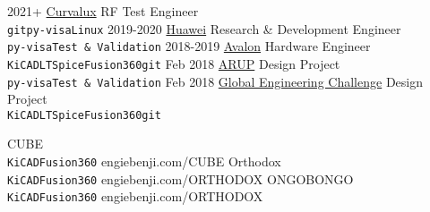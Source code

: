 \documentclass[9pt]{developercv} %
\begin{document}
\begin{entrylist}
	\entry
		{2021+}
		{\href{https://Curvalux.com}{Curvalux}}
		{RF Test Engineer}
		{\lorem \lorem \lorem\\ \texttt{git}\slashsep\texttt{py-visa}\slashsep\texttt{Linux}}
	\entry
		{2019-2020}
		{\href{https://www.huawei.com/uk/contact-us}{Huawei}}
		{Research \& Development Engineer}
		{\lorem\lorem\\ \texttt{py-visa}\slashsep\texttt{Test \& Validation}}
	\entry
		{2018-2019}
		{\href{https://avalonrov.wixsite.com/avalonrov}{Avalon}}
		{Hardware Engineer}
		{\lorem\lorem\\ \texttt{KiCAD}\slashsep\texttt{LTSpice}\slashsep\texttt{Fusion360}\slashsep\texttt{git}}
	\entry
		{Feb 2018}
		{\href{https://www.huawei.com/uk/contact-us}{ARUP}}
		{Design Project}
		{\lorem\lorem\\ \texttt{py-visa}\slashsep\texttt{Test \& Validation}}
	\entry
		{Feb 2018}
		{\href{https://avalonrov.wixsite.com/avalonrov}{Global Engineering Challenge}}
		{Design Project}
		{\lorem\lorem\\ \texttt{KiCAD}\slashsep\texttt{LTSpice}\slashsep\texttt{Fusion360}\slashsep\texttt{git}}
	
\end{entrylist}



\begin{entrylist}
	\QRentry
		{CUBE}
		{\lorem\lorem\lorem\\ \texttt{KiCAD}\slashsep\texttt{Fusion360}}
		{engiebenji.com/CUBE}
	\QRentry
		{Orthodox}
		{\lorem\lorem\\ \texttt{KiCAD}\slashsep\texttt{Fusion360}}
		{engiebenji.com/ORTHODOX}
	\QRentry
		{ONGOBONGO}
		{\lorem\lorem\\ \texttt{KiCAD}\slashsep\texttt{Fusion360}}
		{engiebenji.com/ORTHODOX}
\end{entrylist}
\end{document}
